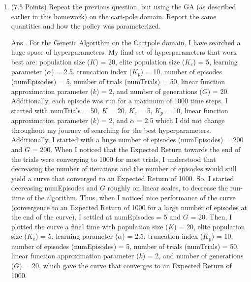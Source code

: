 \documentclass[]{article}
\begin{document}
\begin{enumerate}
{	}
    
    
    \item (7.5 Points) Repeat the previous question, but using the GA (as described earlier in this homework) on the cart-pole domain. Report the same quantities and how the policy was parameterized. 

	{
		\color{blue}
		Ans . For the Genetic Algorithm on the Cartpole domain, I have searched a huge space of hyperparameters. My final set of hyperparameters that work best are: population size ($K$) = 20, elite population size ($K_e$) = 5, learning parameter  ($\alpha$) = 2.5, truncation index ($K_p$) = 10, number of episodes (numEpisodes) = 5, number of trials (numTrials) = 50, linear function approximation parameter ($k$) = 2, and number of generations ($G$) = 20. Additionally, each episode was run for a maximum of 1000 time steps. I started with numTrials = 50, $K$ = 20, $K_e$ = 5, $K_p$ = 10, linear function approximation parameter ($k$) = 2, and $\alpha$ = 2.5  which I did not change throughout my journey of searching for the best hyperparameters. Additionally,  I started with a huge number of episodes (numEpisodes) = 200 and  $G$ = 200. When I noticed that the Expected Return towards the end of the trials were converging to 1000 for most trials, I understood that decreasing the number of iterations and the number of episodes would still yield a curve that converged to an Expected Return of 1000. So, I started decreasing numEpisodes and $G$ roughly on linear scales, to decrease the run-time of the algorithm. Thus, when I noticed nice performance of the curve (convergence to an Expected Return of 1000 for a large number of episodes at the end of the curve), I settled at numEpisodes = 5 and $G$ = 20. Then, I plotted the curve a final time with  population size ($K$) = 20, elite population size ($K_e$) = 5, learning parameter  ($\alpha$) = 2.5, truncation index ($K_p$) = 10, number of episodes (numEpisodes) = 5, number of trials (numTrials) = 50, linear function approximation parameter ($k$) = 2, and number of generations ($G$) = 20, which gave the curve that converges to an Expected Return of 1000.
		
}
\end{enumerate}
\end{document}

